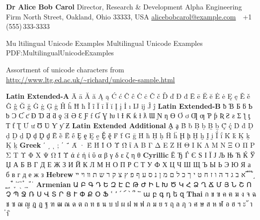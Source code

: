 \documentclass[letterpaper,MMMyyyy,nonstopmode]{simpleresumecv}
\begin{document}
\begin{Body}
	\BigGap
	\BulletItem
	\textbf{Dr Alice Bob Carol}
	\newline
	Director, Research \& Development
	\newline
	Alpha Engineering Firm
	 North Street, Oakland, Ohio 33333, USA
	\newline
	\href{mailto:alicebobcarol@example.com}
	{alicebobcarol@example.com}
	\,\SubBulletSymbol\,
	+1\,(555)\,333-3333
\fi


\iffalse
	\Section
	{Mu	ltilingual Unicode Examples}
	{Multilingual Unicode Examples}
	{PDF:MultilingualUnicodeExamples}
	
	\BulletItem
	Assortment of unicode characters from
	\href{http://www.ltg.ed.ac.uk/~richard/unicode-sample.html}
	{\url{http://www.ltg.ed.ac.uk/~richard/unicode-sample.html}}
	
	\begin{Detail}
	\Item
	\textbf{Latin Extended-A}
	Ā ā Ă ă Ą ą Ć ć Ĉ ĉ Ċ ċ Č č Ď ď Đ đ Ē ē Ĕ ĕ Ė ė Ę ę Ě ě Ĝ ĝ Ğ ğ Ġ ġ Ģ ģ Ĥ ĥ Ħ ħ Ĩ ĩ Ī ī Ĭ ĭ Į į İ ı Ĳ ĳ Ĵ ĵ
	\textbf{Latin Extended-B}
	ƀ Ɓ Ƃ ƃ Ƅ ƅ Ɔ Ƈ ƈ Ɖ Ɗ Ƌ ƌ ƍ Ǝ Ə Ɛ Ƒ ƒ Ɠ Ɣ ƕ Ɩ Ɨ Ƙ ƙ ƚ ƛ Ɯ Ɲ ƞ Ɵ Ơ ơ Ƣ ƣ Ƥ ƥ Ʀ Ƨ ƨ Ʃ ƪ ƫ Ƭ ƭ Ʈ Ư ư Ʊ Ʋ Ƴ ƴ Ƶ
	\textbf{Latin Extended Additional}
	Ḁ ḁ Ḃ ḃ Ḅ ḅ Ḇ ḇ Ḉ ḉ Ḋ ḋ Ḍ ḍ Ḏ ḏ Ḑ ḑ Ḓ ḓ Ḕ ḕ Ḗ ḗ Ḙ ḙ Ḛ ḛ Ḝ ḝ Ḟ ḟ Ḡ ḡ Ḣ ḣ Ḥ ḥ Ḧ ḧ Ḩ ḩ Ḫ ḫ Ḭ ḭ Ḯ ḯ Ḱ ḱ Ḳ ḳ Ḵ ḵ
	\textbf{Greek}
	ʹ ͵ ͺ ; ΄ ΅ Ά · Έ Ή Ί Ό Ύ Ώ ΐ Α Β Γ Δ Ε Ζ Η Θ Ι Κ Λ Μ Ν Ξ Ο Π Ρ Σ Τ Υ Φ Χ Ψ Ω Ϊ Ϋ ά έ ή ί ΰ α β γ δ ε ζ η θ
	\textbf{Cyrillic}
	Ё Ђ Ѓ Є Ѕ І Ї Ј Љ Њ Ћ Ќ Ў Џ А Б В Г Д Е Ж З И Й К Л М Н О П Р С Т У Ф Х Ц Ч Ш Щ Ъ Ы Ь Э Ю Я а б в г д е ж з
	\textbf{Hebrew}
א ב ג ד ה ו ז ח ט י ך כ ל ם מ ן נ ס ע ף פ ץ צ ק ר ש ת װ ױ ײ ֝ ֞ ֟ ֠ ֡ ֣ ֤ ֥ ֦ ֧ ֨ ֩ ֪ ֫ ֬ ֭ ֮ ֯ ְ ֱ ֒ ֓ ֔	
	\textbf{Armenian}
	{\UseSecondaryFont
	Ա Բ Գ Դ Ե Զ Է Ը Թ Ժ Ի Լ Խ Ծ Կ Հ Ձ Ղ Ճ Մ Յ Ն Շ Ո Չ Պ Ջ Ռ Ս Վ Տ Ր Ց Ւ Փ Ք Օ Ֆ ՙ ՚ ՛ ՜ ՝ ՞ ՟ ա բ գ դ ե զ}
	\textbf{Thai}
	{\UseSecondaryFont
	ก ข ฃ ค ฅ ฆ ง จ ฉ ช ซ ฌ ญ ฎ ฏ ฐ ฑ ฒ ณ ด ต ถ ท ธ น บ ป ผ ฝ พ ฟ ภ ม ย ร ฤ ล ฦ ว ศ ษ ส ห ฬ อ ฮ ฯ ะ ั า ำ ิ}
	\end{Detail}
	
	\newpage
	
	
	\begingroup
	\color{red}
	

\end{Body}
\end{document}
